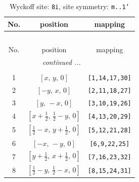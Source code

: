 \documentclass[fleqn,8pt]{jsarticle}
\begin{document}
\renewcommand{\arraystretch}{1.2}
\begin{longtable}{ccc}
\caption{Wyckoff site: {\tt 8i}, site symmetry: {\tt m..1'}}
 \\
 \hline \hline
No. & position & mapping \\ \hline \endfirsthead

\multicolumn{2}{l}{\tablename\ \thetable{}} \\
 \hline \hline
No. & position & mapping \\ \hline \endhead

 \hline \hline
\multicolumn{2}{r}{\footnotesize\it continued ...} \\ \endfoot

 \hline \hline
\multicolumn{2}{r}{} \\ \endlastfoot

1 & $\left[ x,\, y,\, 0 \right]$ & {\tt [1,14,17,30]} \\ \hline
2 & $\left[ - y,\, x,\, 0 \right]$ & {\tt [2,11,18,27]} \\ \hline
3 & $\left[ y,\, - x,\, 0 \right]$ & {\tt [3,10,19,26]} \\ \hline
4 & $\left[ x + \frac{1}{2},\, \frac{1}{2} - y,\, 0 \right]$ & {\tt [4,13,20,29]} \\ \hline
5 & $\left[ \frac{1}{2} - x,\, y + \frac{1}{2},\, 0 \right]$ & {\tt [5,12,21,28]} \\ \hline
6 & $\left[ - x,\, - y,\, 0 \right]$ & {\tt [6,9,22,25]} \\ \hline
7 & $\left[ y + \frac{1}{2},\, x + \frac{1}{2},\, 0 \right]$ & {\tt [7,16,23,32]} \\ \hline
8 & $\left[ \frac{1}{2} - y,\, \frac{1}{2} - x,\, 0 \right]$ & {\tt [8,15,24,31]} \\
\end{longtable}
\renewcommand{\arraystretch}{1.2}
\end{document}

